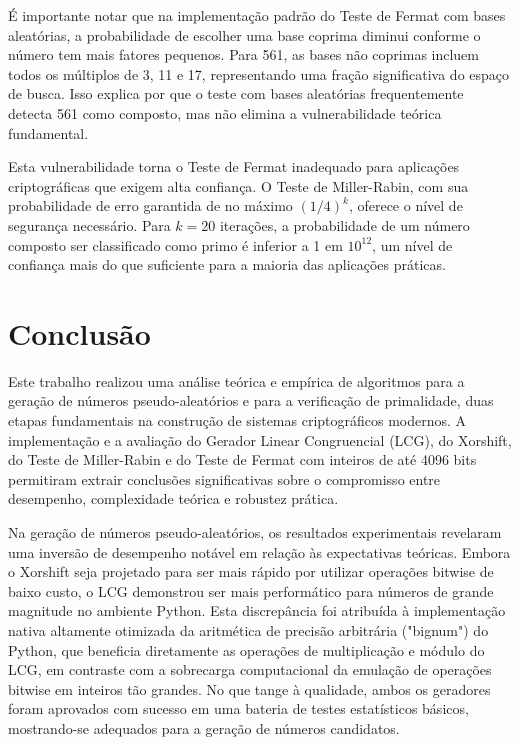 \documentclass[a4paper, 11pt]{article}
\begin{document}
É importante notar que na implementação padrão do Teste de Fermat com bases aleatórias, a probabilidade de escolher uma base coprima diminui conforme o número tem mais fatores pequenos. Para 561, as bases não coprimas incluem todos os múltiplos de 3, 11 e 17, representando uma fração significativa do espaço de busca. Isso explica por que o teste com bases aleatórias frequentemente detecta 561 como composto, mas não elimina a vulnerabilidade teórica fundamental.

Esta vulnerabilidade torna o Teste de Fermat inadequado para aplicações criptográficas que exigem alta confiança. O Teste de Miller-Rabin, com sua probabilidade de erro garantida de no máximo $(1/4)^k$, oferece o nível de segurança necessário. Para $k=20$ iterações, a probabilidade de um número composto ser classificado como primo é inferior a 1 em $10^{12}$, um nível de confiança mais do que suficiente para a maioria das aplicações práticas.


\section{Conclusão}

Este trabalho realizou uma análise teórica e empírica de algoritmos para a geração de números pseudo-aleatórios e para a verificação de primalidade, duas etapas fundamentais na construção de sistemas criptográficos modernos. A implementação e a avaliação do Gerador Linear Congruencial (LCG), do Xorshift, do Teste de Miller-Rabin e do Teste de Fermat com inteiros de até 4096 bits permitiram extrair conclusões significativas sobre o compromisso entre desempenho, complexidade teórica e robustez prática.

Na geração de números pseudo-aleatórios, os resultados experimentais revelaram uma inversão de desempenho notável em relação às expectativas teóricas. Embora o Xorshift seja projetado para ser mais rápido por utilizar operações bitwise de baixo custo, o LCG demonstrou ser mais performático para números de grande magnitude no ambiente Python. Esta discrepância foi atribuída à implementação nativa altamente otimizada da aritmética de precisão arbitrária ("bignum") do Python, que beneficia diretamente as operações de multiplicação e módulo do LCG, em contraste com a sobrecarga computacional da emulação de operações bitwise em inteiros tão grandes. No que tange à qualidade, ambos os geradores foram aprovados com sucesso em uma bateria de testes estatísticos básicos, mostrando-se adequados para a geração de números candidatos. 
\end{document}
